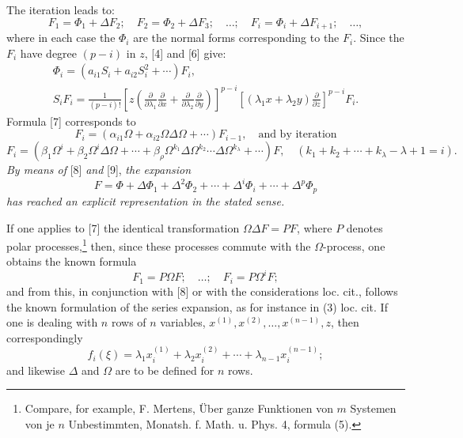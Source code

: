 \documentclass[11pt]{article}
\providecommand{\p}{\partial}
\providecommand{\p}{\partial}
\begin{document}
The iteration leads to:
\[
        F_1=\Phi_1+\Delta F_2;\quad F_2=\Phi_2+\Delta F_3;\quad\ldots;\quad
        F_i=\Phi_i+\Delta F_{i+1};\quad\ldots,
\]
where in each case the $\Phi_i$ are the normal forms corresponding to the $F_i$. Since the $F_i$ have degree $(p-i)$ in $z$, [4] and [6] give:
\begin{equation}
\begin{gathered}
        \Phi_i=(a_{i1}S_i+a_{i2}S_i^2+\cdots)F_i,\\
        S_iF_i=\frac1{(p-i)!}
        \left[z\left(\frac{\p}{\p\lambda_1}\frac{\p}{\p x}+
        \frac{\p}{\p\lambda_2}\frac{\p}{\p y}\right)\right]^{p-i}
        \left[(\lambda_1x+\lambda_2y)\frac{\p}{\p z}\right]^{p-i}F_i.
\end{gathered}
\tag{8}
\end{equation}
Formula [7] corresponds to
\[
        F_i=(\alpha_{i1}\Omega+\alpha_{i2}\Omega\Delta\Omega+\cdots)F_{i-1},
        \quad\text{and by iteration}
\]
\begin{equation}
        F_i=(\beta_1\Omega^i+\beta_2\Omega^i\Delta\Omega+\cdots
        +\beta_\rho\Omega^{k_1}\Delta\Omega^{k_2}\cdots\Delta\Omega^{k_\lambda}+\cdots)F,
        \quad(k_1+k_2+\cdots+k_\lambda-\lambda+1=i).
\tag{9}
\end{equation}
\emph{By means of} [8] \emph{and} [9], \emph{the expansion}
\[
        F=\Phi+\Delta\Phi_1+\Delta^2\Phi_2+\cdots+\Delta^i\Phi_i+\cdots+\Delta^p\Phi_p
\]
\emph{has reached an explicit representation in the stated sense.}

If one applies to [7] the identical transformation $\Omega\Delta F=PF$, where $P$ denotes polar processes,\footnote{Compare, for example, F. Mertens, Über ganze Funktionen von $m$ Systemen von je $n$ Unbestimmten, Monatsh. f. Math. u. Phys. 4, formula (5).} then, since these processes commute with the $\Omega$-process, one obtains the known formula
\[
        F_1=P\Omega F;\quad\ldots;\quad F_i=P\Omega^iF;
\]
and from this, in conjunction with [8] or with the considerations loc. cit., follows the known formulation of the series expansion, as for instance in (3) loc. cit. If one is dealing with $n$ rows of $n$ variables, $x^{(1)},x^{(2)},\ldots,x^{(n-1)},z$, then correspondingly
\[
        f_i(\xi)=\lambda_1x_i^{(1)}+\lambda_2x_i^{(2)}+\cdots+\lambda_{n-1}x_i^{(n-1)};
\]
and likewise $\Delta$ and $\Omega$ are to be defined for $n$ rows.
\end{document}
